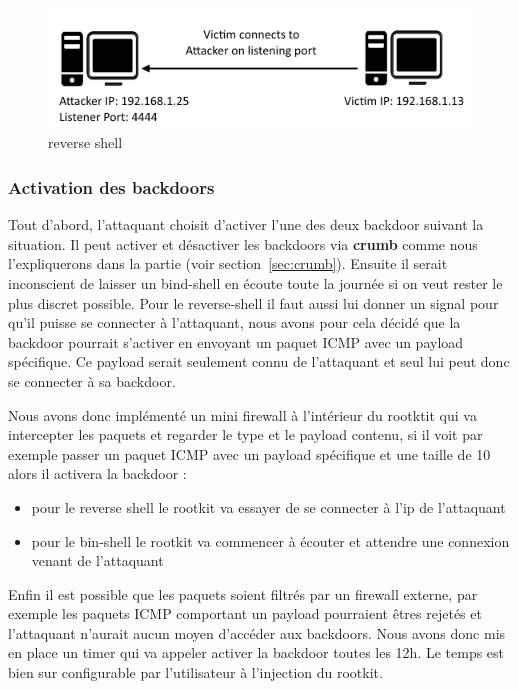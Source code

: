 \documentclass[11pt]{article}
\begin{document}
\begin{figure}[H] 
\begin{center}
\includegraphics{./img/reverse-shell.png}

\caption[dsfsdf]{reverse shell}
\end{center}
\end{figure}
            
        \subsubsection{Activation des backdoors}
            
Tout d'abord, l'attaquant choisit d'activer l'une des deux backdoor suivant la situation. Il peut activer et désactiver les backdoors via \textbf{crumb} comme nous l'expliquerons dans la partie (voir section~\ref{sec:crumb}). 
Ensuite il serait inconscient de laisser un bind-shell en écoute toute la journée si on veut rester le plus discret possible. Pour le reverse-shell il faut aussi lui donner un signal pour qu'il puisse se connecter à l'attaquant, nous avons pour cela décidé que la backdoor pourrait s'activer en envoyant un paquet ICMP avec un payload spécifique. Ce payload serait seulement connu de l'attaquant et seul lui peut donc se connecter à sa backdoor.

Nous avons donc implémenté un mini firewall à l'intérieur du rootktit qui va intercepter les paquets et regarder le type et le payload contenu, si il voit par exemple passer un paquet ICMP avec un payload spécifique et une taille de 10 alors il activera la backdoor :
\begin{itemize}
 \item pour le reverse shell le rootkit va essayer de se connecter à l'ip de l'attaquant
 \item pour le bin-shell le rootkit va commencer à écouter et attendre une connexion venant de l'attaquant
\end{itemize}

    Enfin il est possible que les paquets soient filtrés par un firewall externe, par exemple les paquets ICMP comportant un payload pourraient êtres rejetés et l'attaquant n'aurait aucun moyen d'accéder aux backdoors. Nous avons donc mis en place un timer qui va appeler activer la backdoor toutes les 12h. Le temps est bien sur configurable par l'utilisateur à l'injection du rootkit.
        
\end{document}
